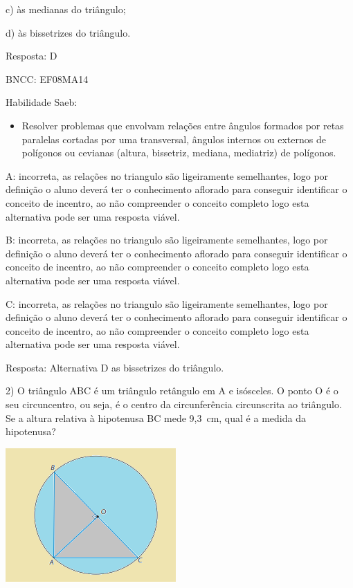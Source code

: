 {c) às medianas do triângulo;

d) às bissetrizes do triângulo.

Resposta: D

BNCC: EF08MA14

Habilidade Saeb:

\begin{itemize}
\tightlist
\item
  Resolver problemas que envolvam relações entre ângulos formados por
  retas paralelas cortadas por uma transversal, ângulos internos ou
  externos de polígonos ou cevianas (altura, bissetriz, mediana,
  mediatriz) de polígonos.
\end{itemize}

A: incorreta, as relações no triangulo são ligeiramente semelhantes,
logo por definição o aluno deverá ter o conhecimento aflorado para
conseguir identificar o conceito de incentro, ao não compreender o
conceito completo logo esta alternativa pode ser uma resposta viável.

B: incorreta, as relações no triangulo são ligeiramente semelhantes,
logo por definição o aluno deverá ter o conhecimento aflorado para
conseguir identificar o conceito de incentro, ao não compreender o
conceito completo logo esta alternativa pode ser uma resposta viável.

C: incorreta, as relações no triangulo são ligeiramente semelhantes,
logo por definição o aluno deverá ter o conhecimento aflorado para
conseguir identificar o conceito de incentro, ao não compreender o
conceito completo logo esta alternativa pode ser uma resposta viável.

Resposta: Alternativa D as bissetrizes do triângulo.

2) O triângulo ABC é um triângulo retângulo em A e isósceles. O ponto O
é o seu circuncentro, ou seja, é o centro da circunferência circunscrita
ao triângulo. Se a altura relativa à hipotenusa BC mede 9,3~cm, qual é a
medida da hipotenusa?

\includegraphics[width=2.5625in,height=2.02083in]{./imgSAEB_8_MAT/media/image35.png}

}
